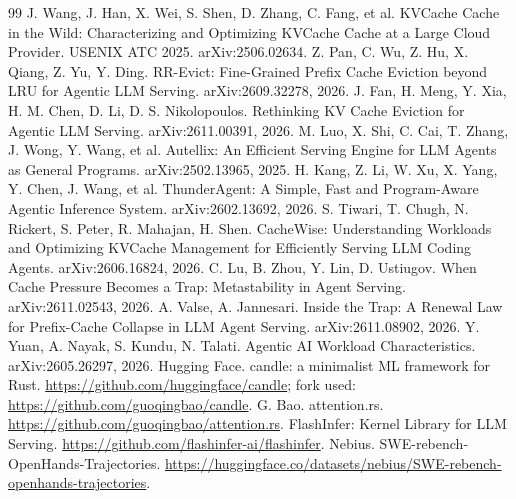 \documentclass[11pt]{article}
\begin{document}
\begin{thebibliography}{99}
 J. Wang, J. Han, X. Wei, S. Shen, D. Zhang, C. Fang, et al. KVCache Cache in the Wild: Characterizing and Optimizing KVCache Cache at a Large Cloud Provider. USENIX ATC 2025. arXiv:2506.02634.
 Z. Pan, C. Wu, Z. Hu, X. Qiang, Z. Yu, Y. Ding. RR-Evict: Fine-Grained Prefix Cache Eviction beyond LRU for Agentic LLM Serving. arXiv:2609.32278, 2026.
 J. Fan, H. Meng, Y. Xia, H. M. Chen, D. Li, D. S. Nikolopoulos. Rethinking KV Cache Eviction for Agentic LLM Serving. arXiv:2611.00391, 2026.
 M. Luo, X. Shi, C. Cai, T. Zhang, J. Wong, Y. Wang, et al. Autellix: An Efficient Serving Engine for LLM Agents as General Programs. arXiv:2502.13965, 2025.
 H. Kang, Z. Li, W. Xu, X. Yang, Y. Chen, J. Wang, et al. ThunderAgent: A Simple, Fast and Program-Aware Agentic Inference System. arXiv:2602.13692, 2026.
 S. Tiwari, T. Chugh, N. Rickert, S. Peter, R. Mahajan, H. Shen. CacheWise: Understanding Workloads and Optimizing KVCache Management for Efficiently Serving LLM Coding Agents. arXiv:2606.16824, 2026.
 C. Lu, B. Zhou, Y. Lin, D. Ustiugov. When Cache Pressure Becomes a Trap: Metastability in Agent Serving. arXiv:2611.02543, 2026.
 A. Valse, A. Jannesari. Inside the Trap: A Renewal Law for Prefix-Cache Collapse in LLM Agent Serving. arXiv:2611.08902, 2026.
 Y. Yuan, A. Nayak, S. Kundu, N. Talati. Agentic AI Workload Characteristics. arXiv:2605.26297, 2026.
 Hugging Face. candle: a minimalist ML framework for Rust. \url{https://github.com/huggingface/candle}; fork used: \url{https://github.com/guoqingbao/candle}.
 G. Bao. attention.rs. \url{https://github.com/guoqingbao/attention.rs}.
 FlashInfer: Kernel Library for LLM Serving. \url{https://github.com/flashinfer-ai/flashinfer}.
 Nebius. SWE-rebench-OpenHands-Trajectories. \url{https://huggingface.co/datasets/nebius/SWE-rebench-openhands-trajectories}.
\end{thebibliography}
\end{document}
